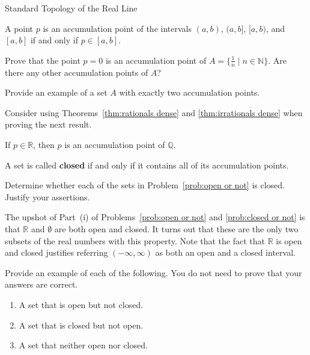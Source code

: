 \begin{section}{Standard Topology of the Real Line}
\begin{theorem}
A point $p$ is an accumulation point of the intervals $(a,b)$, $(a,b]$, $[a,b)$, and $[a,b]$ if and only if $p\in [a,b]$.
\end{theorem}

\begin{problem}
Prove that the point $p=0$ is an accumulation point of $A=\{\frac{1}{n}\mid n \in \mathbb{N}\}$.  Are there any other accumulation points of $A$? 
\end{problem}

\begin{problem}
Provide an example of a set $A$ with exactly two accumulation points.
\end{problem}

Consider using Theorems~\ref{thm:rationals dense} and \ref{thm:irrationals dense} when proving the next result.

\begin{theorem}
If $p\in\mathbb{R}$, then $p$ is an accumulation point of $\mathbb{Q}$.
\end{theorem}

\begin{definition}
A set is called \textbf{closed} if and only if it contains all of its accumulation points.
\end{definition}

\begin{problem}\label{prob:closed or not}
Determine whether each of the sets in Problem~\ref{prob:open or not} is closed. Justify your assertions.
\end{problem}

The upshot of Part~(i) of Problems~\ref{prob:open or not} and \ref{prob:closed or not} is that $\mathbb{R}$ and $\emptyset$ are both open and closed.  It turns out that these are the only two subsets of the real numbers with this property.  Note that the fact that $\mathbb{R}$ is open and closed justifies referring $(-\infty, \infty)$ as both an open and a closed interval.

\begin{problem}\label{prob:open vs closed}
Provide an example of each of the following.  You do not need to prove that your answers are correct.
\begin{enumerate}[label=\textrm{(\alph*)}]
\item A set that is open but not closed.
\item A set that is closed but not open.
\item\label{prob:open vs closed last} A set that neither open nor closed.
\end{enumerate}
\end{problem}


\end{section}

